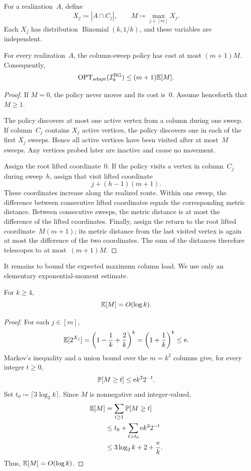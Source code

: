 \documentclass[12pt,a4paper,oneside]{report}
\begin{document}
For a realization~$A$, define
\[
    X_j\coloneqq|A\cap C_j|,
    \qquad
    M\coloneqq\max_{j\in[m]}X_j.
\]
Each $X_j$ has distribution $\operatorname{Binomial}(k,1/k)$, and these
variables are independent.

\begin{lemma}\label{lem:rectangular-grid-sweep}
For every realization~$A$, the column-sweep policy has cost at most
$(m+1)M$.  Consequently,
\[
    \operatorname{OPT}_\mathrm{adapt}(\mathcal I_k^{\mathrm{RG}})
    \le
    (m+1)\mathbb{E}[M].
\]
\end{lemma}

\begin{proof}
If $M=0$, the policy never moves and its cost is~$0$.  Assume henceforth that
$M\ge1$.

The policy discovers at most one active vertex from a column during one
sweep.  If column~$C_j$ contains $X_j$ active vertices, the policy discovers
one in each of the first $X_j$ sweeps.  Hence all active vertices have been
visited after at most~$M$ sweeps.  Any vertices probed later are inactive and
cause no movement.

Assign the root lifted coordinate~$0$.  If the policy visits a vertex in
column~$C_j$ during sweep~$h$, assign that visit lifted coordinate
\[
    j+(h-1)(m+1).
\]
These coordinates increase along the realized route.  Within one sweep, the
difference between consecutive lifted coordinates equals the corresponding
metric distance.  Between consecutive sweeps, the metric distance is at most
the difference of the lifted coordinates.  Finally, assign the return to the
root lifted coordinate~$M(m+1)$; its metric distance from the last visited
vertex is again at most the difference of the two coordinates.  The sum of
the distances therefore telescopes to at most~$(m+1)M$.
\end{proof}

It remains to bound the expected maximum column load.  We use only an
elementary exponential-moment estimate.

\begin{lemma}\label{lem:rectangular-grid-load}
For $k\ge4$,
\[
    \mathbb{E}[M]=O(\log k).
\]
\end{lemma}

\begin{proof}
For each $j\in[m]$,
\[
    \mathbb{E}[2^{X_j}]
    =\left(1-\frac1k+\frac2k\right)^k
    =\left(1+\frac1k\right)^k
    \le \mathrm{e}.
\]
Markov's inequality and a union bound over the $m=k^2$ columns give, for
every integer $t\ge0$,
\[
    \mathbb{P}[M\ge t]
    \le
    \mathrm{e} k^2 2^{-t}.
\]
Set $t_0\coloneqq\lceil3\log_2 k\rceil$.  Since $M$ is nonnegative and
integer-valued,
\begin{align*}
    \mathbb{E}[M]
    &=\sum_{t\ge1}\mathbb{P}[M\ge t]\\
    &\le t_0+\sum_{t>t_0}\mathrm{e} k^2 2^{-t}\\
    &\le 3\log_2 k+2+\frac{\mathrm{e}}{k}.
\end{align*}
Thus, $\mathbb{E}[M]=O(\log k)$.
\end{proof}
\end{document}

